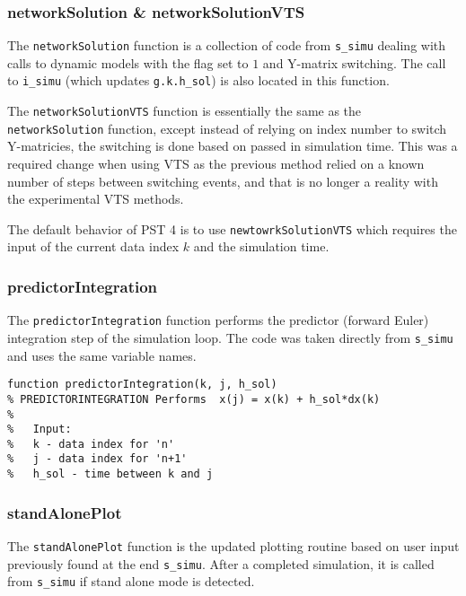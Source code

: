 \subsubsection{networkSolution \& networkSolutionVTS}  
The \verb|networkSolution| function is a collection of code from \verb|s_simu| dealing with calls to dynamic models with the flag set to $1$ and Y-matrix switching.
The call to \verb|i_simu| (which updates \verb|g.k.h_sol|) is also located in this function.

The \verb|networkSolutionVTS| function is essentially the same as the \verb|networkSolution| function, except instead of relying on index number to switch Y-matricies, the switching is done based on passed in simulation time.
This was a required change when using VTS as the previous method relied on a known number of steps between switching events, and that is no longer a reality with the experimental VTS methods.

The default behavior of PST 4 is to use \verb|newtowrkSolutionVTS| which requires the input of the current data index $k$ and the simulation time.

\subsubsection{predictorIntegration}  
The \verb|predictorIntegration| function performs the predictor (forward Euler) integration step of the simulation loop.
The code was taken directly from \verb|s_simu| and uses the same variable names.

\begin{verbatim}
function predictorIntegration(k, j, h_sol)
% PREDICTORINTEGRATION Performs  x(j) = x(k) + h_sol*dx(k)
%
%   Input:
%   k - data index for 'n'
%   j - data index for 'n+1'
%   h_sol - time between k and j
\end{verbatim}


\subsubsection{standAlonePlot}  
The \verb|standAlonePlot| function is the updated plotting routine based on user input previously found at the end \verb|s_simu|.
After a completed simulation, it is called from \verb|s_simu| if stand alone mode is detected.

